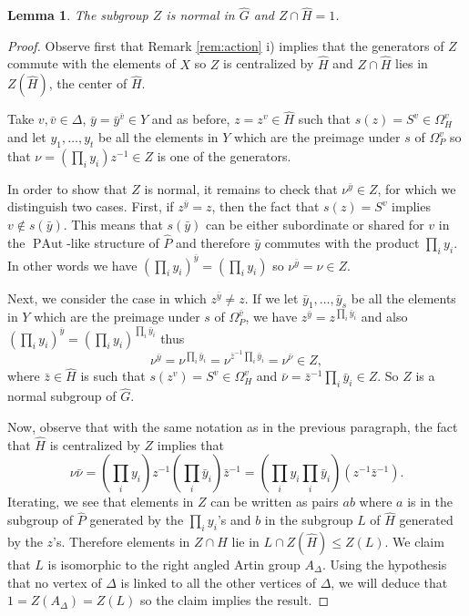 \documentclass[10pt]{amsart}
\newtheorem{lemma}[theorem]{Lemma}
\theoremstyle{definition}
\newcommand{\PAut}{\operatorname{PAut}}
\theoremstyle{definition}
\numberwithin{equation}{section}
\begin{document}
\begin{lemma}\label{lem:Z} The subgroup $Z$ is normal in $\hat G$ and $Z\cap\hat H=1$.
\end{lemma}
\begin{proof} Observe first that Remark \ref{rem:action} i) implies that the generators of $Z$ commute with the elements of $X$ so $Z$ is centralized by $\hat H$ and $Z\cap\hat H$ lies in $Z(\hat H)$, the center of $\hat H$. 



 Take $v,\bar v\in\Delta$, $\bar y=\bar y^{\bar v} \in Y$
and as before, $z=z^v\in\hat H$ such that $s(z)=S^v\in\Omega_H^v$ and let  $y_1,\ldots,y_t$ be all the elements in $Y$ which are the preimage under $s$ of $\Omega^v_P$  so that $\nu=(\prod _iy_i)z^{-1}\in Z$ is one of the generators.

In order to show that $Z$ is normal, it remains to check that $\nu^{\bar y}\in Z$, for which we distinguish two cases. First, if $z^{\bar y}=z$, then the fact that $s(z)=S^v$ implies $v\not\in s(\bar y)$. This means that $s(\bar y)$ can be either subordinate or shared for $v$ in the $\PAut$-like structure of $\hat P$ and therefore $\bar y$ commutes with the product $\prod_iy_i$. In other words we have
$(\prod_iy_i)^{\bar y}=(\prod_iy_i)$ so $\nu^{\bar y}=\nu \in Z$.

Next, we consider the case in which $z^{\bar y} \neq z$. If we let  $\bar y_1,\ldots,\bar y_s$ be all the elements in $Y$ which are the preimage under $s$ of $\Omega^{\bar v}_P$, we have
 $z^{\bar y}=z^{\prod_i\bar y_i}$ and also $(\prod_iy_i)^{\bar y}=(\prod_iy_i)^{\prod_i\bar y_i}$ thus
\[\nu^{\bar y}=\nu^{\prod_i\bar y_i}=\nu^{\bar z^{-1}\prod_i\bar y_i} = \nu^{\bar \nu} \in Z,\]
where  $\bar z\in\hat H$ is such that $s(z^v)=S^v\in\Omega_H^v$ and $\bar\nu= \bar z^{-1}\prod_i\bar y_i \in Z$. So $Z$ is a normal subgroup of $\hat{G}$.

Now, observe that with the same notation as in the previous paragraph, the fact that $\hat H$ is centralized by $Z$ implies that
\[\nu\bar\nu=(\prod _iy_i)z^{-1}(\prod_i\bar y_i)\bar z^{-1}=(\prod _iy_i\prod_i\bar y_i)(z^{-1}\bar{z}^{-1}).\]
Iterating, we see that elements in $Z$ can be written as pairs $ab$ where $a$ is in the subgroup of $\hat P$ generated by the $\prod_iy_i$'s and $b$ in the subgroup $L$ of $\hat H$ generated by the $z$'s. Therefore elements in $Z\cap\hat H$ lie in $L\cap Z(\hat H)\leq Z(L)$. We claim that $L$ is isomorphic to the right angled Artin group $A_\Delta$. Using the 
 hypothesis that no vertex of $\Delta$ is linked to all the other vertices of $\Delta$, we will deduce that $1=Z(A_\Delta)=Z(L)$ so the claim implies the result.


\end{proof}
\end{document}

